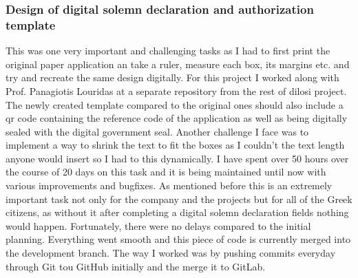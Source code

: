 \subsubsection{Design of digital solemn declaration and authorization template}
This was one very important and challenging tasks as I had to first print the original
paper application an take a ruler, measure each box, its margins etc. and try and recreate
the same design digitally. For this project I worked along with Prof. Panagiotis Louridas at
a separate repository from the rest of dilosi project. The newly created template compared to the
original ones should also include a qr code containing the reference code of the application as well
as being digitally sealed with the digital government seal. Another challenge I face was to implement
a way to shrink the text to fit the boxes as I couldn't the text length anyone would insert so I had to this dynamically. I have spent over 50 hours over the course of 20 days on this task and it is being maintained until now with various improvements and bugfixes. As mentioned before this is an extremely important task not only for the company and the projects but for all of the Greek citizens, 
as without it after completing a digital solemn declaration fields nothing would happen. Fortunately, there were no delays compared to the initial planning. Everything went smooth and this piece of code is currently merged into the development branch. The way I worked was by pushing commits everyday through Git tou GitHub initially and the merge it to GitLab.

